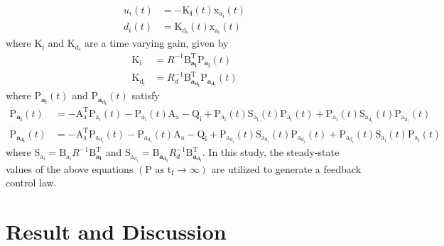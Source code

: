 \documentclass[3p,times]{elsarticle}
\begin{document}
\begin{align}
		{{u_i}}(t) &= -\boldsymbol{{\mathrm{K}}_{i}}(t) \boldsymbol{{\mathrm{x_{a_i}}}}(t)\\
	{{d_i}}(t) &=\boldsymbol{{\mathrm{K_{d_i}}}}(t)\boldsymbol{{\mathrm{x_{a_i}}}}(t)
\end{align}
where $\boldsymbol{{\mathrm{K_i}}}$ and $\boldsymbol{{\mathrm{K_{d_i}}}}$ are a time varying gain, given by
\begin{align}
	\boldsymbol{{\mathrm{K_i}}} &= {{{R}}^{-1}}\boldsymbol{{\mathrm{B}_{a_i}^\mathrm{T}}}\boldsymbol{{\mathrm{P}}_{a_i}}(t)\\
	\boldsymbol{{\mathrm{K_{d_i}}}} &= {{{R}}^{-1}_{d}}\boldsymbol{{\mathrm{B}_{a_{d_i}}^\mathrm{T}}}\boldsymbol{{\mathrm{P}}_{a_{d_i}}}(t)
\end{align}
where $\boldsymbol{{\mathrm{P}}_{a_i}}(t)$ and $\boldsymbol{{\mathrm{P}}_{a_{d_i}}}(t)$ satisfy
\begin{align}\label{coupled_riccatti_LQIDG}
            \boldsymbol{\dot{\mathrm{P}}_{a_i}}(t) &= -\boldsymbol{\mathrm{A^\mathrm{T}_a}}\boldsymbol{\mathrm{P_{a_i}}}(t) - \boldsymbol{\mathrm{P_{a_i}}}(t)\boldsymbol{\mathrm{A_a}} - \boldsymbol{\mathrm{Q_i}} +\boldsymbol{\mathrm{P_{a_i}}}(t)\boldsymbol{\mathrm{S_{a_i}}}(t)\boldsymbol{\mathrm{P_{a_i}}}(t) + \boldsymbol{\mathrm{P_{a_i}}}(t)\boldsymbol{\mathrm{S_{a_{d_i}}}}(t)\boldsymbol{\mathrm{P_{a_{d_i}}}}(t)\\
            \boldsymbol{\dot{\mathrm{P}}_{a_{d_i}}}(t) &= -\boldsymbol{\mathrm{A^\mathrm{T}_a}}\boldsymbol{\mathrm{P_{a_{d_i}}}}(t) - \boldsymbol{\mathrm{P_{a_{d_i}}}}(t)\boldsymbol{\mathrm{A_a}} - \boldsymbol{\mathrm{Q_{i}}} +\boldsymbol{\mathrm{P_{a_{d_i}}}}(t)\boldsymbol{\mathrm{S_{a_{d_i}}}}(t)\boldsymbol{\mathrm{P_{a_{d_i}}}}(t) + \boldsymbol{\mathrm{P_{a_{d_i}}}}(t)\boldsymbol{\mathrm{S_{a_i}}}(t)\boldsymbol{\mathrm{P_{a_i}}}(t)
\end{align}
where $\boldsymbol{\mathrm{S_{a_i}}} = \boldsymbol{\mathrm{B_{a_i}}}R^{-1}\boldsymbol{\mathrm{B}^\mathrm{T}_{a_i}}$ and $\boldsymbol{\mathrm{S_{a_{d_i}}}} = \boldsymbol{\mathrm{B}_{a_{d_i}}}R_{d}^{-1}\boldsymbol{\mathrm{B}^\mathrm{T}_{a_{d_i}}}$.
In this study, the steady-state values of the above equations $(\boldsymbol{{\mathrm{P}}} \text{ as } \mathrm{t_f} \to \infty)$ are utilized to generate a feedback control law.

\section{Result and Discussion}\label{sec:results}\label{sec:results}
\end{document}
